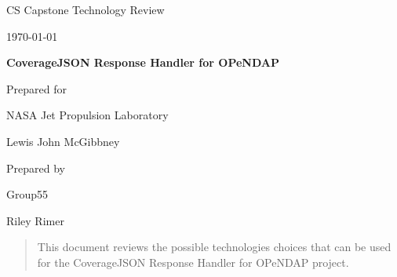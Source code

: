 \documentclass[onecolumn, draftclsnofoot,10pt, compsoc]{IEEEtran}
\def \CapstoneTeamNumber{55}
\def \GroupMemberOne{Riley Rimer}
\def \CapstoneProjectName{CoverageJSON Response Handler for OPeNDAP}
\def \CapstoneSponsorCompany{NASA Jet Propulsion Laboratory}
\def \CapstoneSponsorPerson{Lewis John McGibbney}
\def \DocType{	%
				Technology Review
				}
\newcommand{\NameSigPair}[1]{\par
\makebox[2.75in][r]{#1} \hfil 	\makebox[3.25in]{\makebox[2.25in]{\hrulefill} \hfill		\makebox[.75in]{\hrulefill}}
\par\vspace{-12pt} \textit{\tiny\noindent
\makebox[2.75in]{} \hfil	\makebox[3.25in]{\makebox[2.25in][r]{Signature} \hfill	\makebox[.75in][r]{Date}}}}
\renewcommand{\NameSigPair}[1]{#1}
\begin{document}
\begin{titlepage}
    \begin{singlespace}
        \hfill    
        \par\vspace{.2in}
        \centering
        \scshape{
            \huge CS Capstone \DocType \par
            {\large\today}\par
            \vspace{.5in}
            \textbf{\Huge\CapstoneProjectName}\par
                        \vspace{.5in}

            \vfill
            {\large Prepared for}\par
            \Huge \CapstoneSponsorCompany\par
            \vspace{5pt}
            {\Large\NameSigPair{\CapstoneSponsorPerson}\par}
            {\large Prepared by }\par
            Group\CapstoneTeamNumber\par
            \vspace{5pt}
            {\Large
                \NameSigPair{\GroupMemberOne}\par
            }
            \vspace{20pt}
        }
        \begin{abstract}
        	This document reviews the possible technologies choices that can be used for the CoverageJSON Response Handler for OPeNDAP project. 
        \end{abstract}     
    \end{singlespace}
\end{titlepage}
\newpage
{}
\clearpage
\end{document}
